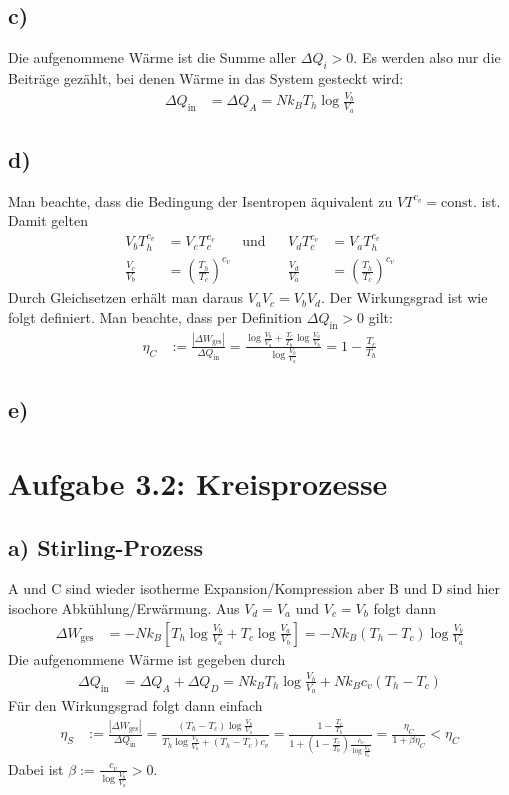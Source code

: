 \documentclass[a4paper,12pt]{article}
\newcommand{\kla}{}
\newcommand{\klam}{}
\newcommand{\tecxt}{}
\begin{document}
\subsection*{c)}Die aufgenommene Wärme ist die Summe aller $\Delta Q_i>0$. Es werden also nur die Beiträge gezählt, bei denen Wärme in das System gesteckt wird:
\begin{align*}
\Delta Q_\tecxt\text{in}&=\Delta Q_A=Nk_BT_h\log\frac{V_b}{V_a}
\end{align*}
\subsection*{d)}Man beachte, dass die Bedingung der Isentropen äquivalent zu $VT^{c_v}=\tecxt\text{const.}$ ist. Damit gelten
\begin{align*}
V_bT_h^{c_v}&=V_cT_c^{c_v}&\tecxt\text{und}&&V_dT_c^{c_v}&=V_aT_h^{c_v}\\
\frac{V_c}{V_b}&=\kla\left( {\frac{T_h}{T_c}} \right)^{c_v}&&&\frac{V_d}{V_a}&=\kla\left( {\frac{T_h}{T_c}} \right)^{c_v}
\end{align*}
Durch Gleichsetzen erhält man daraus $V_aV_c=V_bV_d$. Der Wirkungsgrad ist wie folgt definiert. Man beachte, dass per Definition $\Delta Q_\tecxt\text{in}>0$ gilt:
\begin{align*}
\eta_C&:=\frac{|\Delta W_\tecxt\text{ges}|}{\Delta Q_\tecxt\text{in}}=\frac{\log\frac{V_b}{V_a}+\frac{T_c}{T_h}\log\frac{V_a}{V_b}}{\log\frac{V_b}{V_a}}=1-\frac{T_c}{T_h}
\end{align*}
\subsection*{e)}
\section*{Aufgabe 3.2: Kreisprozesse}
\subsection*{a) Stirling-Prozess}
A und C sind wieder isotherme Expansion/Kompression aber B und D sind hier isochore Abkühlung/Erwärmung. Aus $V_d=V_a$ und $V_c=V_b$ folgt dann
\begin{align*}
\Delta W_\tecxt\text{ges}&=-Nk_B\klam\left[ {T_h\log\frac{V_b}{V_a}+T_c\log\frac{V_a}{V_b}} \right]=-Nk_B(T_h-T_c)\log\frac{V_b}{V_a}
\end{align*}
Die aufgenommene Wärme ist gegeben durch
\begin{align*}
\Delta Q_\tecxt\text{in}&=\Delta Q_A+\Delta Q_D=Nk_BT_h\log\frac{V_b}{V_a}+Nk_Bc_v(T_h-T_c)
\end{align*}
Für den Wirkungsgrad folgt dann einfach
\begin{align*}
\eta_S&:=\frac{|\Delta W_\tecxt\text{ges}|}{\Delta Q_\tecxt\text{in}}=\frac{(T_h-T_c)\log\frac{V_b}{V_a}}{T_h\log\frac{V_b}{V_a}+(T_h-T_c)c_v}=\frac{1-\frac{T_c}{T_h}}{1+\kla\left( {1-\frac{T_c}{T_h}} \right)\frac{c_v}{\log\frac{V_b}{V_a}}}=\frac{\eta_C}{1+\beta\eta_C} <\eta_C
\end{align*}
Dabei ist $\beta:=\frac{c_v}{\log\frac{V_b}{V_a}}>0$.
\end{document}
